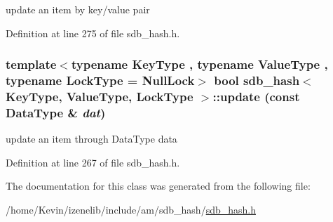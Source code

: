 update an item by key/value pair 

Definition at line 275 of file sdb\_\-hash.h.\hypertarget{classsdb__hash_01a9c2ad383dac61d5e6ff3e20841689}{
\subsubsection[{update}]{\setlength{\rightskip}{0pt plus 5cm}template$<$typename KeyType , typename ValueType , typename LockType  = NullLock$>$ bool {\bf sdb\_\-hash}$<$ KeyType, ValueType, LockType $>$::update (const DataType \& {\em dat})}}
\label{classsdb__hash_01a9c2ad383dac61d5e6ff3e20841689}


update an item through DataType data 

Definition at line 267 of file sdb\_\-hash.h.

The documentation for this class was generated from the following file:\begin{CompactItemize}
\item 
/home/Kevin/izenelib/include/am/sdb\_\-hash/\hyperlink{sdb__hash_8h}{sdb\_\-hash.h}\end{CompactItemize}
